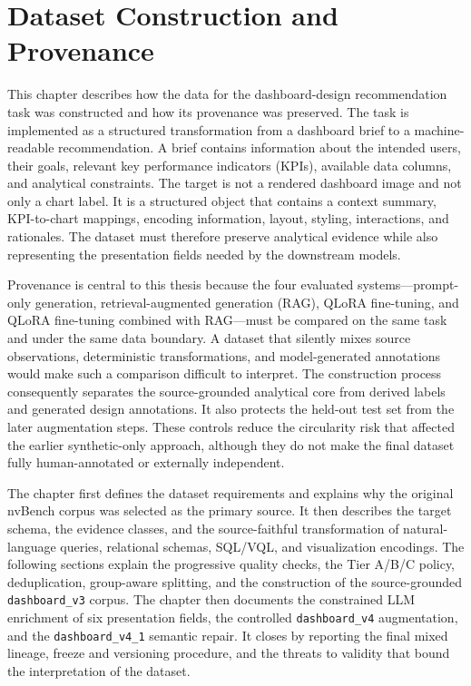 \chapter{Dataset Construction and Provenance}

This chapter describes how the data for the dashboard-design recommendation task was constructed and how its provenance was preserved. The task is implemented as a structured transformation from a dashboard brief to a machine-readable recommendation. A brief contains information about the intended users, their goals, relevant key performance indicators (KPIs), available data columns, and analytical constraints. The target is not a rendered dashboard image and not only a chart label. It is a structured object that contains a context summary, KPI-to-chart mappings, encoding information, layout, styling, interactions, and rationales. The dataset must therefore preserve analytical evidence while also representing the presentation fields needed by the downstream models.

Provenance is central to this thesis because the four evaluated systems---prompt-only generation, retrieval-augmented generation (RAG), QLoRA fine-tuning, and QLoRA fine-tuning combined with RAG---must be compared on the same task and under the same data boundary. A dataset that silently mixes source observations, deterministic transformations, and model-generated annotations would make such a comparison difficult to interpret. The construction process consequently separates the source-grounded analytical core from derived labels and generated design annotations. It also protects the held-out test set from the later augmentation steps. These controls reduce the circularity risk that affected the earlier synthetic-only approach, although they do not make the final dataset fully human-annotated or externally independent.

The chapter first defines the dataset requirements and explains why the original nvBench corpus was selected as the primary source. It then describes the target schema, the evidence classes, and the source-faithful transformation of natural-language queries, relational schemas, SQL/VQL, and visualization encodings. The following sections explain the progressive quality checks, the Tier A/B/C policy, deduplication, group-aware splitting, and the construction of the source-grounded \texttt{dashboard\_v3} corpus. The chapter then documents the constrained LLM enrichment of six presentation fields, the controlled \texttt{dashboard\_v4} augmentation, and the \texttt{dashboard\_v4\_1} semantic repair. It closes by reporting the final mixed lineage, freeze and versioning procedure, and the threats to validity that bound the interpretation of the dataset.

